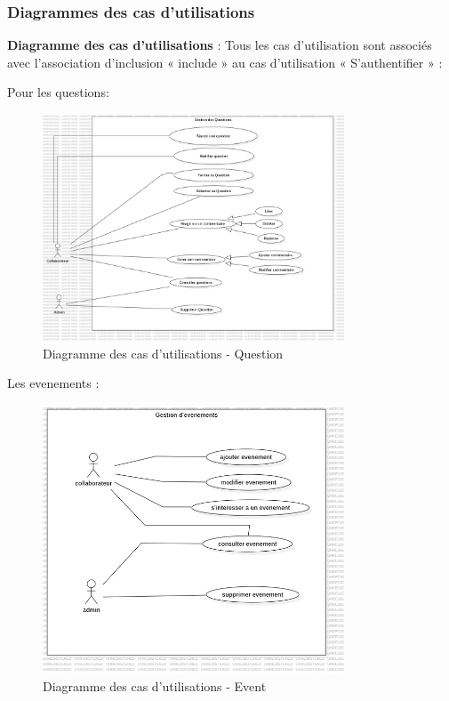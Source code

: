 \documentclass{article}
\begin{document}
            \subsubsection{Diagrammes des cas d'utilisations}
                \textbf{Diagramme des cas d'utilisations} : Tous les cas d'utilisation sont associés avec l'association d'inclusion « include » au 
                cas d'utilisation « S'authentifier » :
                
                Pour les questions: 
                \begin{figure}[h!]
                    \centering
                    \includegraphics[width=0.8\textwidth]{assets/diagrammes/jpg/Model1!useCaseQuestion_0.jpg}
                    \caption{Diagramme des cas d'utilisations - Question}
                \end{figure}
                
                \FloatBarrier
                
                Les evenements : 
                \begin{figure}[h!]
                    \centering
                    \includegraphics[width=0.8\textwidth]{assets/diagrammes/jpg/Model2!UseCaseEvent_1.jpg}
                    \caption{Diagramme des cas d'utilisations - Event}
                \end{figure}
                
\end{document}
